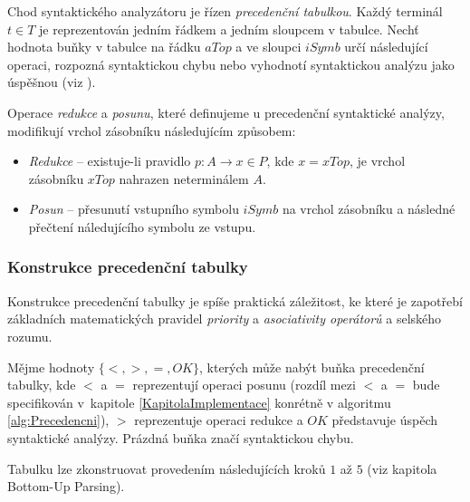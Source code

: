 Chod syntaktického analyzátoru je řízen \emph{precedenční tabulkou}. Každý terminál $t \in T$ je reprezentován jedním řádkem a jedním sloupcem v tabulce. Nechť hodnota buňky v tabulce
na řádku $aTop$ a ve sloupci $iSymb$ určí následující operaci, rozpozná syntaktickou chybu nebo vyhodnotí syntaktickou analýzu jako úspěšnou (viz \cite{Meduna:2014:FormalLanguagesAndComputation}).

Operace \emph{redukce} a \emph{posunu}, které definujeme u precedenční syntaktické analýzy, modifikují vrchol zásobníku následujícím způsobem:
\begin{itemize}
  \item \emph{Redukce} -- existuje-li pravidlo $p: A \rightarrow x \in P$, kde $x = xTop$, je vrchol zásobníku $xTop$ nahrazen neterminálem $A$.
  \item \emph{Posun} -- přesunutí vstupního symbolu $iSymb$ na vrchol zásobníku a následné přečtení náledujícího symbolu ze vstupu.
\end{itemize}

\subsubsection{Konstrukce precedenční tabulky} \label{nadpisKonstrukcePrecTabulky}
Konstrukce precedenční tabulky je spíše praktická záležitost, ke které je zapotřebí základních matematických pravidel \emph{priority} a \emph{asociativity operátorů} a
selského rozumu.

\begin{konvence}
  Mějme hodnoty $\{<, >, =, OK\}$, kterých může nabýt buňka precedenční tabulky, kde $<$ a $=$ reprezentují operaci posunu (rozdíl mezi $<$ a $=$ bude specifikován
  v~kapitole \ref{KapitolaImplementace} konrétně v algoritmu \ref{alg:Precedencni}), $>$ reprezentuje operaci redukce a $OK$
  představuje úspěch syntaktické analýzy. Prázdná buňka značí syntaktickou chybu.
\end{konvence}

Tabulku lze zkonstruovat provedením následujících kroků $1$ až $5$ (viz \cite{VYPa:2022} kapitola Bottom-Up Parsing). \label{postupKonstrukcePrec}

